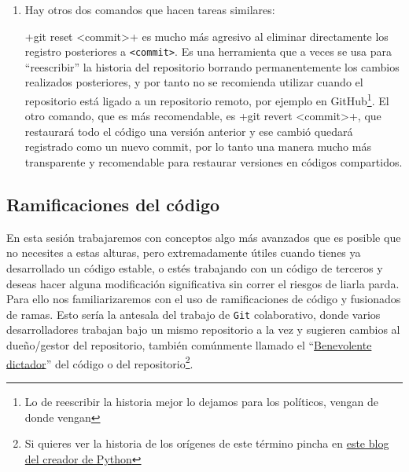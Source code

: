 \documentclass[a5paper,10pt]{article}
\begin{document}
\begin{enumerate}
    \item Hay otros dos comandos que hacen tareas similares:     
    
    \cverb+git reset <commit>+ es mucho más agresivo al eliminar directamente los registro posteriores a \verb+<commit>+. Es una herramienta que a veces se usa para ``reescribir'' la historia del repositorio borrando permanentemente los cambios realizados posteriores, y por tanto no se recomienda utilizar cuando el repositorio está ligado a un repositorio remoto, por ejemplo en GitHub\footnote{Lo de reescribir la historia mejor lo dejamos para los políticos, vengan de donde vengan}. El otro comando, que es más recomendable, es \cverb+git revert <commit>+, que restaurará todo el código una versión anterior y ese cambió quedará registrado como un nuevo commit, por lo tanto una manera mucho más transparente y recomendable para restaurar versiones en códigos compartidos.
    
   \end{enumerate}
   
  \subsection{Ramificaciones del código}
    En esta sesión trabajaremos con conceptos algo más avanzados que es posible que no necesites a estas alturas, pero extremadamente útiles cuando tienes ya desarrollado un código estable, o estés trabajando con un código de terceros y deseas hacer alguna modificación significativa sin correr el riesgos de liarla parda. Para ello nos familiarizaremos con el uso de ramificaciones de código y fusionados de ramas. Esto sería la antesala del trabajo de \verb+Git+ colaborativo, donde varios desarrolladores trabajan bajo un mismo repositorio a la vez y sugieren cambios al dueño/gestor del repositorio, también comúnmente llamado el ``\href{http://catb.org/~esr/writings/homesteading/homesteading/ar01s16.html}{Benevolente dictador}'' del código o del repositorio\footnote{Si quieres ver la historia de los orígenes de este término pincha en \href{https://www.artima.com/weblogs/viewpost.jsp?thread=235725}{este blog del creador de Python}}.
    
\end{document}
